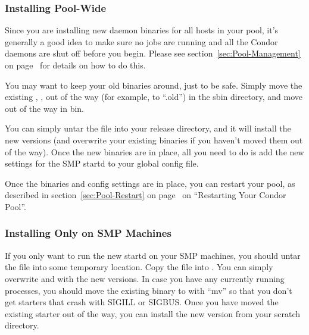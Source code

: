 \subsubsection{\label{sec:SMP-full-install}Installing Pool-Wide}

Since you are installing new daemon binaries for all hosts in your
pool, it's generally a good idea to make sure no jobs are running and
all the Condor daemons are shut off before you begin.
Please see section~\ref{sec:Pool-Management} on
page~\pageref{sec:Pool-Management} for details on how to do this.

You may want to keep your old binaries around, just to be safe.
Simply move the existing , ,
 out of the way (for example, to
``.old'') in the sbin directory, and move
 out of the way in bin.   

You can simply untar the  file into your release
directory, and it will install the new versions (and overwrite your
existing binaries if you haven't moved them out of the way).
Once the new binaries are in place, all you need to do is add the new
settings for the SMP startd to your global config file.

Once the binaries and config settings are in place, you can restart
your pool, as described in section~\ref{sec:Pool-Restart} on
page~\pageref{sec:Pool-Restart} on ``Restarting Your Condor Pool''. 

\subsubsection{\label{sec:SMP-partial-install}Installing Only on SMP
Machines} 

If you only want to run the new startd on your SMP machines, you
should untar the  file into some temporary
location. 
Copy the  file into
.
You can simply overwrite  and
 with the new versions.
In case you have any currently running  processes, you
should move the existing binary to  with ``mv'' so
that you don't get starters that crash with SIGILL or SIGBUS.  
Once you have moved the existing starter out of the way, you can
install the new version from your scratch directory.

